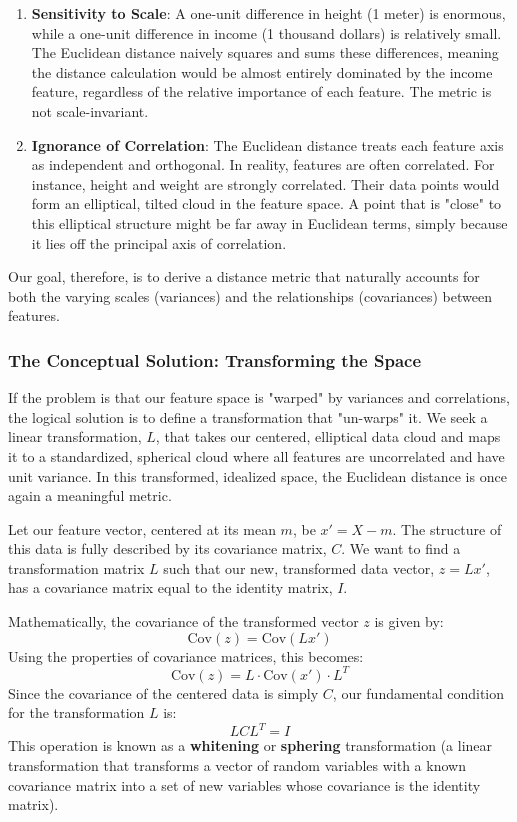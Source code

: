 \begin{enumerate}
    \item \textbf{Sensitivity to Scale}: A one-unit difference in height (1 meter) is enormous, while a one-unit difference in income (1 thousand dollars) is relatively small. The Euclidean distance naively squares and sums these differences, meaning the distance calculation would be almost entirely dominated by the income feature, regardless of the relative importance of each feature. The metric is not scale-invariant.
    \item \textbf{Ignorance of Correlation}: The Euclidean distance treats each feature axis as independent and orthogonal. In reality, features are often correlated. For instance, height and weight are strongly correlated. Their data points would form an elliptical, tilted cloud in the feature space. A point that is "close" to this elliptical structure might be far away in Euclidean terms, simply because it lies off the principal axis of correlation.
\end{enumerate}
Our goal, therefore, is to derive a distance metric that naturally accounts for both the varying scales (variances) and the relationships (covariances) between features.

\subsubsection*{The Conceptual Solution: Transforming the Space}
If the problem is that our feature space is "warped" by variances and correlations, the logical solution is to define a transformation that "un-warps" it. We seek a linear transformation, $L$, that takes our centered, elliptical data cloud and maps it to a standardized, spherical cloud where all features are uncorrelated and have unit variance. In this transformed, idealized space, the Euclidean distance is once again a meaningful metric.

Let our feature vector, centered at its mean $m$, be $x' = X - m$. The structure of this data is fully described by its covariance matrix, $C$. We want to find a transformation matrix $L$ such that our new, transformed data vector, $z = L x'$, has a covariance matrix equal to the identity matrix, $I$.

Mathematically, the covariance of the transformed vector $z$ is given by:
$$ \text{Cov}(z) = \text{Cov}(L x') $$
Using the properties of covariance matrices, this becomes:
$$ \text{Cov}(z) = L \cdot \text{Cov}(x') \cdot L^T $$
Since the covariance of the centered data is simply $C$, our fundamental condition for the transformation $L$ is:
$$ L C L^T = I $$
This operation is known as a \textbf{whitening} or \textbf{sphering} transformation (a linear transformation that transforms a vector of random variables with a known covariance matrix into a set of new variables whose covariance is the identity matrix).

